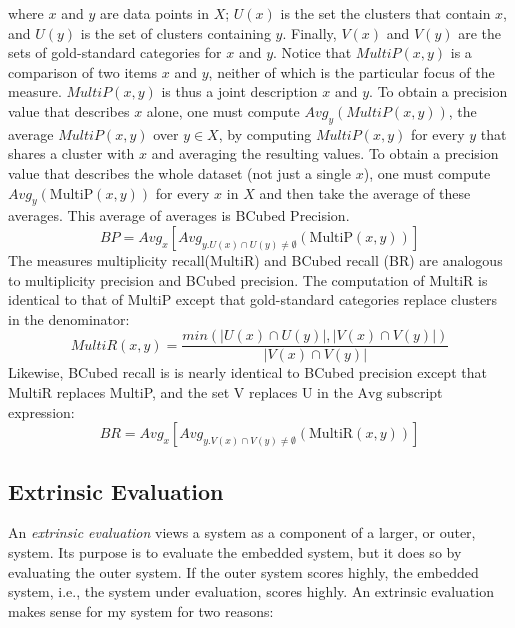 where $x$ and $y$ are data points in $X$; $U(x)$ is the set the clusters that contain $x$, 
and $U(y)$ is the set of clusters containing $y$.
Finally, 
$V(x)$ and $V(y)$ are the sets of gold-standard categories for $x$ and $y$. 
Notice that $MultiP(x,y)$ is a comparison of two items $x$ and $y$, neither of which is the 
particular focus of the measure. $MultiP(x,y)$ is thus a joint description $x$ and $y$. 
To obtain a precision value that describes $x$ alone, one must compute $Avg_{y}(MultiP (x,y))$, the 
average $MultiP(x,y)$ over $y \in X$, by computing $MultiP(x,y)$ for every $y$ that shares a cluster with $x$ 
and averaging the resulting values. To obtain a precision value that describes the whole dataset (not just a single $x$), 
one must compute $Avg_y(\text{MultiP}(x,y))$ for every $x$ in $X$ and then take the average of these averages. 
This average of averages is BCubed Precision. 
\begin{equation}
BP=Avg_x [Avg_{y.U(x) \cap U(y) \neq \emptyset}(\text{MultiP}(x,y))]
\end{equation}
The measures multiplicity recall(MultiR) and BCubed recall (BR) are analogous to multiplicity precision and
 BCubed precision. The computation of MultiR is identical to that of MultiP 
 except that gold-standard categories replace clusters in the denominator: 
\begin{equation}
MultiR(x,y) = \frac{min(|U(x) \cap U(y)|, |V(x) \cap V (y)|)}{|V(x) \cap V(y)|}
\end{equation}
Likewise, BCubed recall is is nearly identical to BCubed precision except that MultiR replaces MultiP, and the set V replaces U in the $\text{Avg}$ subscript expression:
\begin{equation} 
BR = Avg_x [Avg_{y.V(x) \cap V(y) \neq \emptyset}(\text{MultiR}(x,y))]
\end{equation}

\subsection{Extrinsic Evaluation} \label{sec:eval-extrinsic} An \emph{extrinsic evaluation} 
views a system as a component of a larger, or outer, system. 
Its purpose is to evaluate the embedded system, but it does so by evaluating the outer 
system. If the outer system scores highly,
the embedded system, i.e., the system under evaluation, scores highly.
An extrinsic evaluation makes sense for my system for two reasons:

